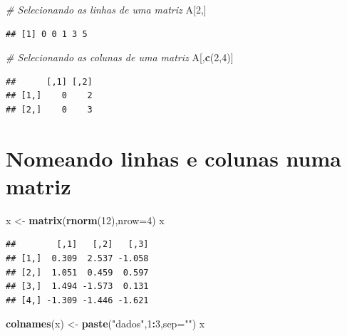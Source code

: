 \documentclass[
]{book}
\newenvironment{Shaded}{\begin{snugshade}}{\end{snugshade}}
\newcommand{\AttributeTok}[1]{\textcolor[rgb]{0.13,0.29,0.53}{#1}}
\newcommand{\CommentTok}[1]{\textcolor[rgb]{0.56,0.35,0.01}{\textit{#1}}}
\newcommand{\DecValTok}[1]{\textcolor[rgb]{0.00,0.00,0.81}{#1}}
\newcommand{\FunctionTok}[1]{\textcolor[rgb]{0.13,0.29,0.53}{\textbf{#1}}}
\newcommand{\NormalTok}[1]{#1}
\newcommand{\OtherTok}[1]{\textcolor[rgb]{0.56,0.35,0.01}{#1}}
\newcommand{\SpecialCharTok}[1]{\textcolor[rgb]{0.81,0.36,0.00}{\textbf{#1}}}
\newcommand{\StringTok}[1]{\textcolor[rgb]{0.31,0.60,0.02}{#1}}
\theoremstyle{definition}
\theoremstyle{definition}
\theoremstyle{definition}
\theoremstyle{definition}
\theoremstyle{remark}
\begin{document}
\begin{Shaded}
\begin{Highlighting}[]
\CommentTok{\# Selecionando as linhas de uma matriz}
\NormalTok{A[}\DecValTok{2}\NormalTok{,]}
\end{Highlighting}
\end{Shaded}

\begin{verbatim}
## [1] 0 0 1 3 5
\end{verbatim}

\begin{Shaded}
\begin{Highlighting}[]
\CommentTok{\# Selecionando as colunas de uma matriz}
\NormalTok{A[,}\FunctionTok{c}\NormalTok{(}\DecValTok{2}\NormalTok{,}\DecValTok{4}\NormalTok{)] }
\end{Highlighting}
\end{Shaded}

\begin{verbatim}
##      [,1] [,2]
## [1,]    0    2
## [2,]    0    3
\end{verbatim}

\section{Nomeando linhas e colunas numa matriz}\label{nomeando-linhas-e-colunas-numa-matriz}

\begin{Shaded}
\begin{Highlighting}[]
\NormalTok{x }\OtherTok{\textless{}{-}} \FunctionTok{matrix}\NormalTok{(}\FunctionTok{rnorm}\NormalTok{(}\DecValTok{12}\NormalTok{),}\AttributeTok{nrow=}\DecValTok{4}\NormalTok{)}
\NormalTok{x}
\end{Highlighting}
\end{Shaded}

\begin{verbatim}
##        [,1]   [,2]   [,3]
## [1,]  0.309  2.537 -1.058
## [2,]  1.051  0.459  0.597
## [3,]  1.494 -1.573  0.131
## [4,] -1.309 -1.446 -1.621
\end{verbatim}

\begin{Shaded}
\begin{Highlighting}[]
\FunctionTok{colnames}\NormalTok{(x) }\OtherTok{\textless{}{-}} \FunctionTok{paste}\NormalTok{(}\StringTok{"dados"}\NormalTok{,}\DecValTok{1}\SpecialCharTok{:}\DecValTok{3}\NormalTok{,}\AttributeTok{sep=}\StringTok{""}\NormalTok{)}
\NormalTok{x}
\end{Highlighting}
\end{Shaded}
\end{document}
